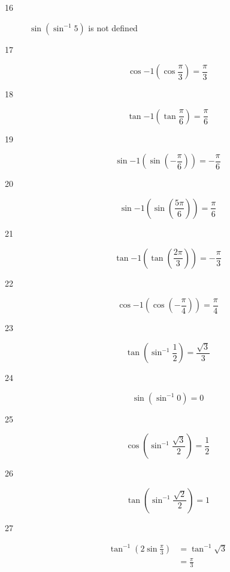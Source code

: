 \documentclass{exam}
\begin{document}
\begin{description}
      \item[16] $\sin \left( \sin^{-1} 5 \right)$ is not defined

      \item[17] 
        \[
          \cos{-1} \left( \cos \frac{\pi}{3} \right) = \boxed{ \frac{\pi}{3} }
        \]

      \item[18] 
        \[
          \tan{-1} \left( \tan \frac{\pi}{6} \right) = \boxed{ \frac{\pi}{6} }
        \]

      \item[19] 
        \[
          \sin{-1} \left( \sin \left( -\frac{\pi}{6} \right) \right) = \boxed{ - \frac{\pi}{6} }
        \]

      \item[20] 
        \[
          \sin{-1} \left( \sin \left( \frac{5 \pi}{6} \right) \right) = \boxed{ \frac{\pi}{6} }
        \]

      \item[21] 
        \[
          \tan{-1} \left( \tan \left( \frac{2 \pi}{3} \right) \right) = \boxed{ - \frac{\pi}{3} }
        \]

      \item[22] 
        \[
          \cos{-1} \left( \cos \left( - \frac{\pi}{4} \right) \right) = \boxed{ \frac{\pi}{4} }
        \]

      \item[23] 
        \[
          \tan \left( \sin^{-1} \frac{1}{2} \right) = \boxed{ \frac{\sqrt{3}}{3} }
        \]

      \item[24] 
        \[
          \sin \left( \sin^{-1} 0 \right) = \boxed{ 0 }
        \]

      \item[25] 
        \[
          \cos \left( \sin^{-1} \frac{\sqrt{3}}{2} \right) = \boxed{ \frac{1}{2} }
        \]

      \item[26] 
        \[
          \tan \left( \sin^{-1} \frac{\sqrt{2}}{2} \right) = \boxed{ 1 }
        \]

      \item[27] 
        \begin{align*}
          \tan^{-1} \left( 2 \sin \frac{\pi}{3} \right) & = \tan^{-1} \sqrt{3} \\
                                                        & = \boxed{ \frac{\pi}{3} }
        \end{align*}


\end{description}
\end{document}

